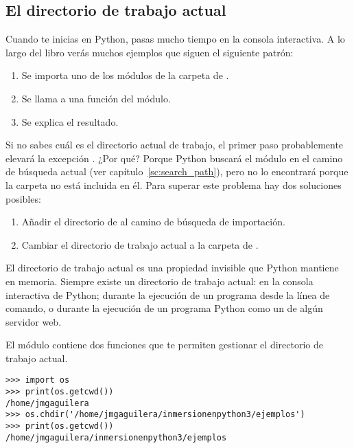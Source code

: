 \subsection{El directorio de trabajo actual}

Cuando te inicias en Python, pasas mucho tiempo en la consola interactiva. A lo largo del libro verás muchos ejemplos que siguen el siguiente patrón:

\begin{enumerate}

\item Se importa uno de los módulos de la carpeta de .

\item Se llama a una función del módulo.

\item Se explica el resultado.

\end{enumerate}

Si no sabes cuál es el directorio actual de trabajo, el primer paso probablemente elevará la excepción . ¿Por qué? Porque Python buscará el módulo en el camino de búsqueda actual (ver capítulo~\ref{sc:search_path}), pero no lo encontrará porque la carpeta  no está incluida en él. Para superar este problema hay dos soluciones posibles:

\begin{enumerate}

\item Añadir el directorio de  al camino de búsqueda de importación.

\item Cambiar el directorio de trabajo actual a la carpeta de .

\end{enumerate}

El directorio de trabajo actual es una propiedad invisible que Python mantiene en memoria. Siempre existe un directorio de trabajo actual: en la consola interactiva de Python; durante la ejecución de un programa desde la línea de comando, o durante la ejecución de un programa Python como un  de algún servidor web.

El módulo  contiene dos funciones que te permiten gestionar el directorio de trabajo actual.

\noindent\begin{minipage}{\textwidth}
\begin{lstlisting}[mathescape=True]
>>> import os
>>> print(os.getcwd())
/home/jmgaguilera
>>> os.chdir('/home/jmgaguilera/inmersionenpython3/ejemplos')
>>> print(os.getcwd())
/home/jmgaguilera/inmersionenpython3/ejemplos
\end{lstlisting}
\end{minipage}

